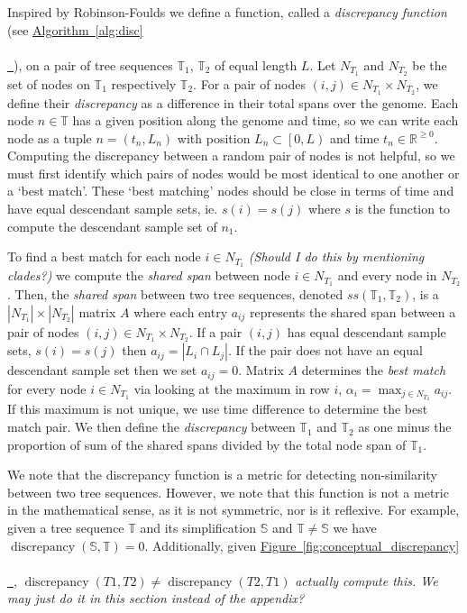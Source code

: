 \documentclass[10pt,twoside,lineno]{gsajnl}
\newcommand{\R}{\mathbb{R}}
\newcommand{\T}{\mathbb{T}}
\newcommand{\comment}[1]{{\color{violet} \it #1}}
\newcommand{\algorithmref}[2][]{%
	\hyperref[{#2}]{%
		Algorithm~\ref*{#2}%
		\ifx\\#1\\%
		\else
		\,#1%
		\fi
	}%
}
\newcommand*{\figref}[2][]{%
	\hyperref[{#2}]{%
		Figure~\ref*{#2}%
		\ifx\\#1\\%
		\else
		\,#1%
		\fi
	}%
}
\begin{document}
 Inspired by Robinson-Foulds we define a function, called a \textit{discrepancy function} (see \algorithmref{alg:disc}), on a pair of tree sequences $\T_1$, $\T_2$ of equal length $L$.
 Let $N_{T_1}$ and $N_{T_2}$ be the set of nodes on $\T_1$ respectively $\T_2$.
 For a pair of nodes $(i,j)\in N_{T_1}\times N_{T_2}$, we define their \textit{discrepancy} as a difference in their total spans over the genome.
 Each node $n\in\T$ has a given position along the genome and time, 
 so we can write each node as a tuple $n = (t_n, L_n)$ with position $L_n\subset \left[0,L\right)$ and time $t_n\in \R^{\geq 0}$.
 Computing the discrepancy between a random pair of nodes is not helpful, 
 so we must first identify which pairs of nodes would be most identical to one another or a `best match'.
 These `best matching' nodes should be close in terms of time and have equal descendant sample sets,
 ie. $s(i) = s(j)$ where $s$ is the function to compute the descendant sample set of $n_1$.
 
 To find a best match for each node $i\in N_{T_1}$ \comment{(Should I do this by mentioning clades?)}
 we compute the \textit{shared span} between node $i\in N_{T_1}$ and every node in $N_{T_2}$.
 Then, the \textit{shared span} between two tree sequences, denoted $ss(\T_1,\T_2)$, is a $|N_{T_1}|\times |N_{T_2}|$ matrix $A$
 where each entry $a_{ij}$ represents the shared span between a pair of nodes $(i,j)\in N_{T_1}\times N_{T_2}$.
 If a pair $(i,j)$ has equal descendant sample sets, $s(i) = s(j)$
 then $a_{ij} = |L_i \cap L_j|$.
 If the pair does not have an equal descendant sample set then we set $a_{ij}=0$.
 Matrix $A$ determines the \textit{best match} for every node $i\in N_{T_1}$
 via looking at the maximum in row $i$, $\alpha_i = \max_{j\in N_{T_2}} a_{ij}$.
 If this maximum is not unique, we use time difference to determine the best match pair.
 We then define the \textit{discrepancy} between $\T_1$ and $\T_2$ as 
 one minus the proportion of sum of the shared spans divided by the total node span of $\T_1$.
 
 We note that the discrepancy function is a metric for detecting non-similarity between two tree sequences. However, we note that this function is not a metric in the mathematical sense, as it is not symmetric, nor is it reflexive. For example, given a tree sequence $\T$ and its simplification $\mathbb{S}$ and $\T\neq\mathbb{S}$ we have $\operatorname{discrepancy}(\mathbb{S}, \T)=0$. Additionally, given \figref{fig:conceptual_discrepancy}, $\operatorname{discrepancy}(T1, T2) \neq \operatorname{discrepancy}(T2, T1)$ \comment{actually compute this. We may just do it in this section instead of the appendix?}
 
\end{document}
